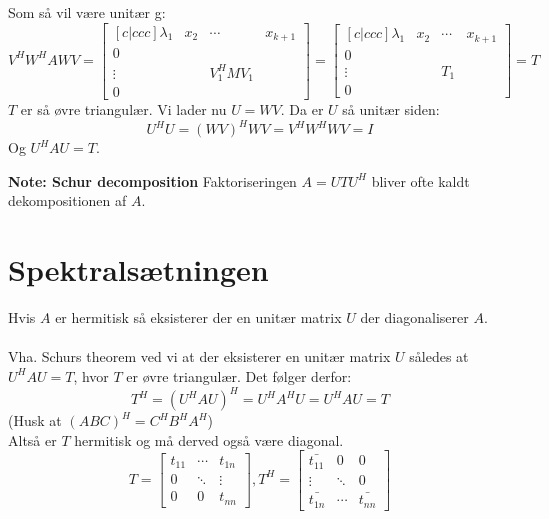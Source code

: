\documentclass[a4paper,oneside,article]{memoir}
\begin{document}
 Som så vil være unitær g:
 $$V^HW^HAWV=\begin{bmatrix}[c|ccc]
    	\lambda_1 & x_2 & \cdots & x_{k+1} \\ \hline
    	0 & & & \\
    	\vdots & & V_1^HMV_1 & \\
    	0 & & &
    	\end{bmatrix}=
    	\begin{bmatrix}[c|ccc]
   		\lambda_1 & x_2 & \cdots & x_{k+1} \\ \hline
   		0 & & & \\
   		\vdots & & T_1 & \\
   		0 & & &
   		\end{bmatrix}
   		=T$$
   	$T$ er så øvre triangulær. Vi lader nu $U=WV$. Da er 
   	$U$ så unitær siden:
   	$$U^HU=(WV)^HWV=V^HW^HWV=I$$
   	Og $U^HAU=T$.
   	
   	\textbf{Note: Schur decomposition}
   	Faktoriseringen $A=UTU^H$ bliver ofte kaldt 
   	dekompositionen af $A$.
   	
   	\section{Spektralsætningen}
   	Hvis $A$ er hermitisk så eksisterer der en unitær 
   	matrix $U$ der diagonaliserer $A$.
   	\\
   	\\
   	Vha. Schurs theorem ved vi at der eksisterer en
   	unitær matrix $U$ således at $U^HAU=T$, hvor $T$
   	er øvre triangulær. Det følger derfor:
   	$$T^H=(U^HAU)^H=U^HA^HU=U^HAU=T$$
   	(Husk at $(ABC)^H=C^HB^HA^H$)\\
   	Altså er $T$ hermitisk og må derved også være
   	diagonal.
   	$$T=\begin{bmatrix}
   	t_{11} & \cdots & t_{1n} \\
   	0 & \ddots & \vdots \\
   	0 & 0 & t_{nn}
   	\end{bmatrix},
   	T^H=\begin{bmatrix}
	   	\bar{t_{11}} & 0 & 0 \\
	   	\vdots & \ddots & 0 \\
	   	\bar{t_{1n}} & \cdots & \bar{t_{nn}}
	   	\end{bmatrix}$$
	
\end{document}
